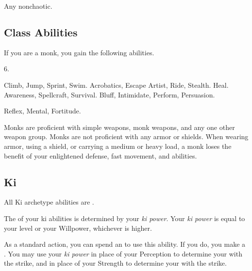      Any nonchaotic.

    \subsection{Class Abilities}
        If you are a monk, you gain the following abilities.

         6.

         Climb, Jump, Sprint, Swim.
         Acrobatics, Escape Artist, Ride, Stealth.
         Heal.
         Awareness, Spellcraft, Survival.
         Bluff, Intimidate, Perform, Persuasion.

          Reflex,  Mental,  Fortitude.

        Monks are proficient with simple weapons, monk weapons, and any one other weapon group.
        Monks are not proficient with any armor or shields.
        When wearing armor, using a shield, or carrying a medium or heavy load, a monk loses the benefit of your enlightened defense, fast movement, and \ki abilities.

        \subsection{Ki}
            All Ki archetype abilities are .

            The  of your ki abilities is determined by your \textit{ki power}.
            Your \textit{ki power} is equal to your level or your Willpower, whichever is higher.

            As a standard action, you can spend an  to use this ability.
            If you do, you make a .
            You may use your \textit{ki power} in place of your Perception to determine your  with the strike, and in place of your Strength to determine your  with the strike.

